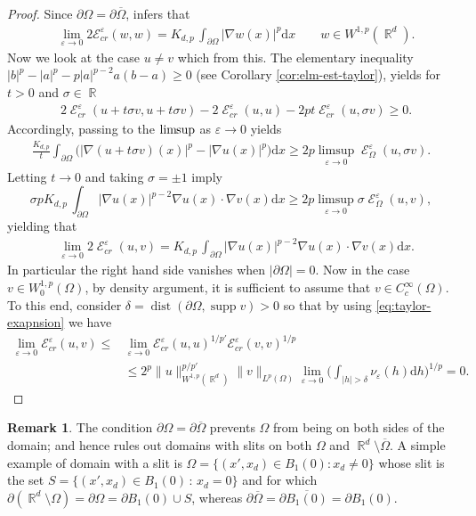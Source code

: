 \documentclass[12pt, reqno]{amsart}%
\theoremstyle{plain}  %
\theoremstyle{definition}  %
\newtheorem{remark}[theorem]{Remark}   %
\numberwithin{equation}{section}
\DeclareMathOperator{\dist}{dist}
\DeclareMathOperator{\supp}{supp}
\DeclareMathOperator{\cE}{\mathcal{E}}
\DeclareMathOperator{\R}{\mathbb{R}}
\renewcommand{\d}{\mathrm{d}}
\newcommand{\eps}{\varepsilon}
\begin{document}
\begin{proof}
Since $\partial\Omega= \partial \overline{\Omega}$,  \cite[Theorem 3.5]{Fog23} infers that
\begin{align*}
&\lim_{\eps\to0}2\mathcal{E}^{\eps}_{cr}(w,w)
=K_{d,p}\,\int_{\partial \Omega}|\nabla w(x)|^p\d x\qquad w\in W^{1,p}(\R^d).
\end{align*}
Now we look at the  case $u\neq v$ which  from this. The elementary inequality   $|b|^p- |a|^p- p|a|^{p-2}a(b-a)\geq 0$ (see Corollary \ref{cor:elm-est-taylor}), yields for $t>0$ and $\sigma\in\R$
\begin{align*}
&2\cE_{cr}^\eps(u+t\sigma v, u+t\sigma v)- 2\cE_{cr}^\eps(u, u)- 2p t\cE_{cr}^\eps(u,\sigma v)
\geq0.
\end{align*}
Accordingly, passing to the $\lim\hspace{-0.5ex}\sup$ as  $\eps\to 0$ yields
\begin{align*}
\frac{K_{d,p}}{t} \int_{\partial \Omega} \Big(|\nabla(u+t\sigma v)(x)|^p-|\nabla u(x)|^p\Big)\d x\geq 2p  \limsup_{\eps\to0} \cE_{\Omega}^\eps(u,\sigma v).
\end{align*}
Letting $t\to 0$ and taking $\sigma=\pm 1$ imply
$$\sigma pK_{d,p}\, \int_{\partial \Omega}|\nabla u(x)|^{p-2}\nabla u(x)\cdot \nabla v(x)\d x\geq 2p\limsup_{\eps\to0} \sigma\cE_{\Omega}^\eps(u, v),$$
yielding that
\begin{align*}
&\lim_{\eps\to0} 2\cE_{cr}^\eps(u, v)
= K_{d,p}\,\int_{\partial \Omega}|\nabla u(x)|^{p-2}\nabla u(x)\cdot \nabla v(x)\d x.
\end{align*}
In particular the right hand side vanishes when $|\partial\Omega|=0$.
Now in the case $v\in W^{1,p}_0(\Omega)$, by density argument, it is sufficient to assume that $v\in C_c^\infty(\Omega) $. To this end, consider $\delta= \dist(\partial\Omega, \supp v)>0$ so that by using \eqref{eq:taylor-exapnsion} we have
\begin{align*}
\lim_{\eps\to0}\mathcal{E}^{\eps}_{cr}(u,v) \leq
&\lim_{\eps\to0}\mathcal{E}^{\eps}_{cr}(u,u)^{1/p'}
\mathcal{E}^{\eps}_{cr}(v,v)^{1/p} \\&
\leq 2^p\|u\|^{p/p'}_{W^{1,p}(\R^d)}\|v\|_{L^p(\Omega)}
\lim_{\eps\to0}\Big(\int_{|h|>\delta} \nu_\eps(h)\d h\Big)^{1/p}=0.
\end{align*}
\end{proof}
\begin{remark}
The condition $\partial \Omega=\partial\overline{\Omega}$ prevents $\Omega$ from being on both sides of the domain; and hence rules out domains with  slits on  both $\Omega$ and $\R^d\setminus\overline{\Omega}$. A simple example of domain with a slit is
$\Omega= \{ (x',x_d)\in B_1(0):x_d\neq0\}$ whose slit is the set $S=\{ (x',x_d)\in B_1(0)\,:\, x_d=0\}$ and for which $\partial(\R^d\setminus\Omega)=\partial\Omega= \partial B_1(0)\cup S$, whereas $\partial\overline{\Omega}= \partial\overline{B_1(0)}= \partial B_1(0)$.
\end{remark}
\end{document}
